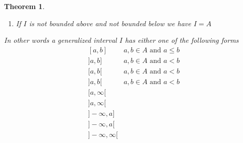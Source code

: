 \documentclass{book}
\newcommand{\nin}{\not\in}
\newtheorem{theorem}{Theorem}
\begin{document}
\begin{theorem}
\begin{enumerate}
\begin{enumerate}
      \item If $\sup (I) \nin I$ then $I =] - \infty, \sup (I) [$
    \end{enumerate}
    \item If $I$ is not bounded above and not bounded below we have $I = A$
  \end{enumerate}
  In other words a generalized interval $I$ has either one of the following
  forms
  \begin{eqnarray*}
    & [a, b] & a, b \in A \text{ and } a \leqslant b\\
    & ] a, b] & a, b \in A \text{ and } a < b\\
    & [a, b [ & a, b \in A \text{ and } a < b\\
    & ] a, b [ & a, b \in A \text{ and } a < b\\
    & [a, \infty [ & \\
    & ] a, \infty [ & \\
    & ] - \infty, a] & \\
    & ] - \infty, a [ & \\
    & ] - \infty, \infty [ & 
  \end{eqnarray*}
\end{theorem}
\end{document}
